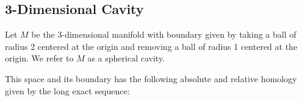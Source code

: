 \documentclass{article}
\begin{document}
\subsection{3-Dimensional Cavity}


Let $M$ be the 3-dimensional manifold with boundary given by taking a ball of radius 2 centered at the origin and removing a ball of radius 1 centered at the origin. We refer to $M$ as a spherical cavity.
\begin{figure}[H]
	\centering
	
\end{figure}
This space and its boundary has the following absolute and relative homology given by the long exact sequence:
\end{document}
